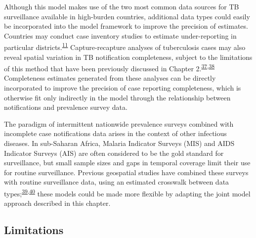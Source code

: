 \documentclass[
]{article}
\begin{document}
Although this model makes use of the two most common data sources for TB surveillance available in high-burden countries, additional data types could easily be incorporated into the model framework to improve the precision of estimates. Countries may conduct case inventory studies to estimate under-reporting in particular districts.\textsuperscript{\protect\hyperlink{ref-Glaziou2018a}{11}} Capture-recapture analyses of tuberculosis cases may also reveal spatial variation in TB notification completeness, subject to the limitations of this method that have been previously discussed in Chapter 2.\textsuperscript{\protect\hyperlink{ref-Hook1995}{37},\protect\hyperlink{ref-VanHest2011}{38}} Completeness estimates generated from these analyses can be directly incorporated to improve the precision of case reporting completeness, which is otherwise fit only indirectly in the model through the relationship between notifications and prevalence survey data.

The paradigm of intermittent nationwide prevalence surveys combined with incomplete case notifications data arises in the context of other infectious diseases. In sub-Saharan Africa, Malaria Indicator Surveys (MIS) and AIDS Indicator Surveys (AIS) are often considered to be the gold standard for surveillance, but small sample sizes and gaps in temporal coverage limit their use for routine surveillance. Previous geospatial studies have combined these surveys with routine surveillance data, using an estimated crosswalk between data types;\textsuperscript{\protect\hyperlink{ref-Dwyer-Lindgren2019}{39},\protect\hyperlink{ref-Lucas2019}{40}} these models could be made more flexible by adapting the joint model approach described in this chapter.

\hypertarget{limitations}{%
\subsection{Limitations}\label{limitations}}
\end{document}
